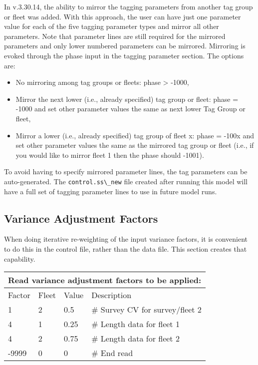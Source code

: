 In v.3.30.14, the ability to mirror the tagging parameters from another tag group or fleet was added. With this approach, the user can have just one parameter value for each of the five tagging parameter types and mirror all other parameters. Note that parameter lines are still required for the mirrored parameters and only lower numbered parameters can be mirrored. Mirroring is evoked through the phase input in the tagging parameter section. The options are:
\begin{itemize}
	\item No mirroring among tag groups or fleets: phase > -1000,
	\item Mirror the next lower (i.e., already specified) tag group or fleet: phase = -1000 and set other parameter values the same as next lower Tag Group or fleet,
	\item Mirror a lower (i.e., already specified) tag group of fleet x: phase = -100x and set other parameter values the same as the mirrored tag group or fleet (i.e., if you would like to mirror fleet 1 then the phase should -1001).
\end{itemize}

To avoid having to specify mirrored parameter lines, the tag parameters can be auto-generated. The \verb|control.ss\_new| file created after running this model will have a full set of tagging parameter lines to use in future model runs.

\hypertarget{GcompVar}{}
\subsection{Variance Adjustment Factors}
When doing iterative re-weighting of the input variance factors, it is convenient to do this in the control file, rather than the data file. This section creates that capability.

\begin{longtable}{p{3cm} p{3cm} p{2.5cm} p{6.25cm}}

	\multicolumn{4}{l}{Read variance adjustment factors to be applied:} \\
	\hline
	Factor & Fleet & Value & Description \Tstrut\Bstrut\\
	\hline
	1 & 2 & 0.5 & \# Survey CV for survey/fleet 2 \Tstrut\\
	4 & 1 & 0.25 & \# Length data for fleet 1 \\
	4 & 2 & 0.75 & \# Length data for fleet 2 \\
	-9999 & 0 & 0 & \# End read \Bstrut\\
	\hline
\end{longtable}


